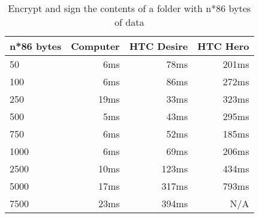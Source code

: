 \begin{table}
  \centering
  \caption{Encrypt and sign the contents of a folder with n*86 bytes of data}
  \begin{tabular}{ | l | r | r | r |}
    \hline
    \textbf{n*86 bytes} & \textbf{Computer} & \textbf{HTC Desire} & \textbf{HTC Hero} \\ \hline
    50      &6ms  &78ms     &201ms    \\ \hline
    100     &6ms  &86ms     &272ms    \\ \hline
    250     &19ms &33ms     &323ms    \\ \hline   
    500     &5ms  &43ms     &295ms    \\ \hline
    750     &6ms  &52ms     &185ms    \\ \hline
    1000    &6ms  &69ms     &206ms    \\ \hline
    2500    &10ms &123ms    &434ms    \\ \hline     
    5000    &17ms &317ms    &793ms    \\ \hline 
    7500    &23ms &394ms    &N/A      \\ \hline 
  \end{tabular}
  \label{tbl:folder:encryptsign}
\end{table}
